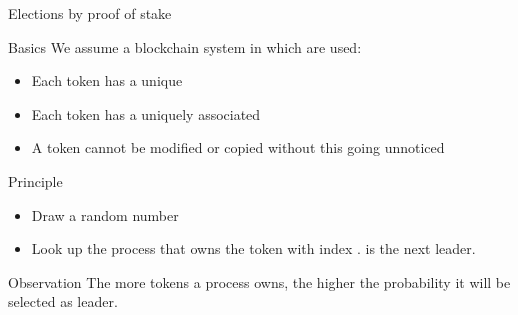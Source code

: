 \begin{slide}{Elections by proof of stake}
  \begin{block}{Basics}
    We assume a blockchain system in which   are used:
    \begin{itemize}
    \item Each token has a unique 
    \item Each token has a uniquely associated  
    \item A token cannot be modified or copied without this going unnoticed
    \end{itemize}
  \end{block}
  \begin{block}{Principle}
    \begin{itemize}
    \item Draw a random number 
    \item Look up the process  that owns the token with index .  is the
      next leader.
    \end{itemize}
  \end{block}
  \begin{alertblock}{Observation}
    The more tokens a process owns, the higher the probability it will be selected as leader.
  \end{alertblock}
\end{slide}
